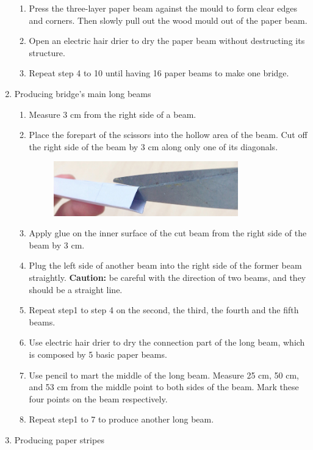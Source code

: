 \begin{enumerate}
\begin{enumerate}
	\item Press the three-layer paper beam against the mould to form clear edges and corners. Then slowly pull out the wood mould out of the paper beam.
	\item Open an electric hair drier to dry the paper beam without destructing its structure.
	\item Repeat step 4 to 10 until having 16 paper beams to make one bridge.
	\end{enumerate}
\item Producing bridge’s main long beams
	\begin{enumerate}
	\item Measure 3 cm from the right side of a beam.
	\item Place the forepart of the scissors into the hollow area of the beam. Cut off the right side of the beam by 3 cm along only one of its diagonals.
	\begin{figure}[H]
	\begin{center}
	\includegraphics[width=8cm]{figure/procedureBridge/forehead}
	\end{center}
	\end{figure}
	\item Apply glue on the inner surface of the cut beam from the right side of the beam by 3 cm.
	\item Plug the left side of another beam into the right side of the former beam straightly. 
	\textbf{Caution:} be careful with the direction of two beams, and they should be a straight line. 
	\item Repeat step1 to step 4 on the second, the third, the fourth and the fifth beams. 
	\item Use electric hair drier to dry the connection part of the long beam, which is composed by 5 basic paper beams. 
	\item Use pencil to mart the middle of the long beam. Measure 25 cm, 50 cm, and 53 cm from the middle point to both sides of the beam. Mark these four points on the beam respectively. 
	\item Repeat step1 to 7 to produce another long beam. 
	\end{enumerate}
\item Producing paper stripes
	\begin{enumerate}

\end{enumerate}
\end{enumerate}
